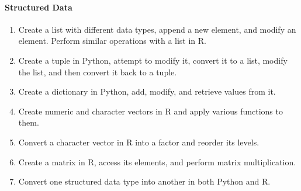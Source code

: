 \paragraph*{Structured Data}
\begin{enumerate}
    \item Create a list with different data types, append a new element, and modify an element. Perform similar operations with a list in R.
    \item Create a tuple in Python, attempt to modify it, convert it to a list, modify the list, and then convert it back to a tuple.
    \item Create a dictionary in Python, add, modify, and retrieve values from it.
    \item Create numeric and character vectors in R and apply various functions to them.
    \item Convert a character vector in R into a factor and reorder its levels.
    \item Create a matrix in R, access its elements, and perform matrix multiplication.
    \item Convert one structured data type into another in both Python and R.
\end{enumerate}
